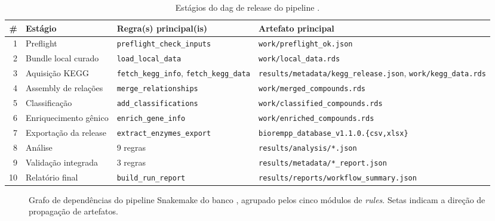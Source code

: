 \begin{table}[htbp]
\centering
\caption{Estágios do \gls{dag} de release do pipeline \biorempp{}.}
\label{tab:c1-stages}
\small
\begin{tabular}{@{}rlll@{}}
\toprule
\textbf{\#} & \textbf{Estágio} & \textbf{Regra(s) principal(is)} & \textbf{Artefato principal} \\
\midrule
1  & Preflight               & \texttt{preflight\_check\_inputs}             & \texttt{work/preflight\_ok.json} \\
2  & Bundle local curado     & \texttt{load\_local\_data}                    & \texttt{work/local\_data.rds} \\
3  & Aquisição KEGG          & \texttt{fetch\_kegg\_info}, \texttt{fetch\_kegg\_data} & \texttt{results/metadata/kegg\_release.json}, \texttt{work/kegg\_data.rds} \\
4  & Assembly de relações    & \texttt{merge\_relationships}       & \texttt{work/merged\_compounds.rds} \\
5  & Classificação           & \texttt{add\_classifications}       & \texttt{work/classified\_compounds.rds} \\
6  & Enriquecimento gênico   & \texttt{enrich\_gene\_info}         & \texttt{work/enriched\_compounds.rds} \\
7  & Exportação da release   & \texttt{extract\_enzymes\_export}   & \texttt{biorempp\_database\_v1.1.0.\{csv,xlsx\}} \\
8  & Análise                 & 9 regras                            & \texttt{results/analysis/*.json} \\
9  & Validação integrada     & 3 regras                            & \texttt{results/metadata/*\_report.json} \\
10 & Relatório final         & \texttt{build\_run\_report}         & \texttt{results/reports/workflow\_summary.json} \\
\bottomrule
\end{tabular}
\end{table}

\begin{figure}[htbp]
\centering
{}
\caption{Grafo de dependências do pipeline Snakemake do banco \biorempp{}, agrupado pelos cinco módulos de \textit{rules}. Setas indicam a direção de propagação de artefatos.}
\label{fig:c1-dag}
\end{figure}

